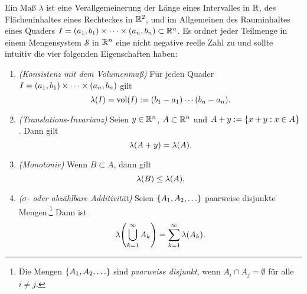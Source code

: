 Ein Maß \(\lambda\) ist eine Verallgemeinerung der Länge eines Intervalles in \(\R\), des Flächeninhaltes eines Rechteckes in \(\R^2\), und im Allgemeinen des Rauminhaltes eines Quaders \(I = \parentheses*{a_1, b_1} \times \cdots \times \parentheses*{a_n, b_n} \subset \R^n\).
Es ordnet jeder Teilmenge in einem Mengensystem \(\mathcal{S}\) in \(\R^n\) eine nicht negative reelle Zahl zu und sollte intuitiv die vier folgenden Eigenschaften haben:
\begin{enumerate}
	\item \emph{(Konsistenz mit dem Volumenmaß)} Für jeden Quader \(I = \parentheses*{a_1, b_1} \times \cdots \times \parentheses*{a_n, b_n}\) gilt
	\begin{equation}\label{equation:9}
		\lambda\parentheses*{I} = \vol\parentheses*{I} := \parentheses*{b_1 - a_1}\cdots\parentheses*{b_n - a_n}.
	\end{equation}
	\item \emph{(Translations-Invarianz)} Seien \(y \in \R^n\), \(A \subset \R^n\) und \(A + y := \braces*{x + y : x \in A}\).
	Dann gilt
	\begin{equation}
		\lambda\parentheses*{A + y} = \lambda\parentheses*{A}.
	\end{equation}
	\item \emph{(Monotonie)} Wenn \(B \subset A\), dann gilt
	\begin{equation}\label{equation:11}
		\lambda\parentheses*{B} \le \lambda\parentheses*{A}.
	\end{equation}
	\item \emph{(\(\sigma\)- oder abzählbare Additivität)} Seien \(\braces*{A_1, A_2, \ldots}\) paarweise disjunkte Mengen.\footnote{Die Mengen \(\braces*{A_1, A_2, \ldots}\) sind \emph{paarweise disjunkt}, wenn \(A_i \cap A_j = \emptyset\) für alle \(i \ne j\).}
	Dann ist
	\begin{equation}\label{equation:12}
		\lambda\parentheses*{\bigcup_{k = 1}^\infty A_k} = \sum_{k = 1}^\infty \lambda\parentheses*{A_k}.
	\end{equation}
\end{enumerate}

